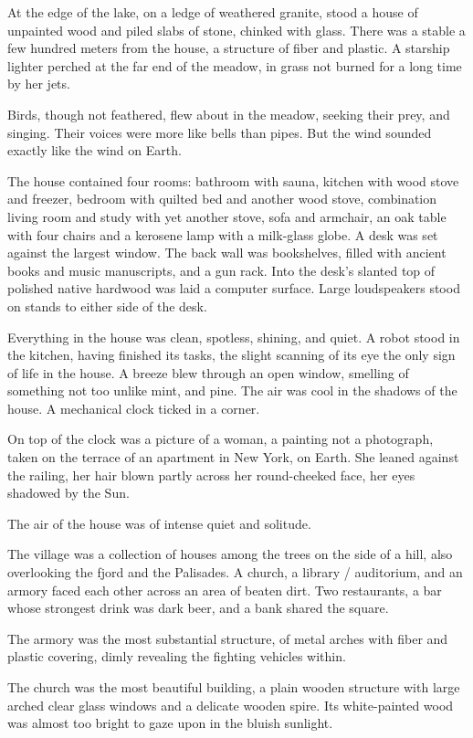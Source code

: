 \documentclass[english,11pt,letterpaper,onecolumn]{scrbook}
\begin{document}
	At the edge of the lake, on a ledge of weathered granite, stood a house of unpainted wood and piled slabs of stone, chinked with glass. There was a stable a few hundred meters from the house, a structure of fiber and plastic. A starship lighter perched at the far end of the meadow, in grass not burned for a long time by her jets.

	Birds, though not feathered, flew about in the meadow, seeking their prey, and singing. Their voices were more like bells than pipes. But the wind sounded exactly like the wind on Earth.

	The house contained four rooms: bathroom with sauna, kitchen with wood stove and freezer, bedroom with quilted bed and another wood stove, combination living room and study with yet another stove, sofa and armchair, an oak table with four chairs and a kerosene lamp with a milk-glass globe. A desk was set against the largest window. The back wall was bookshelves, filled with ancient books and music manuscripts, and a gun rack. Into the desk's slanted top of polished native hardwood was laid a computer surface. Large loudspeakers stood on stands to either side of the desk. 

	Everything in the house was clean, spotless, shining, and quiet. A robot stood in the kitchen, having finished its tasks, the slight scanning of its eye the only sign of life in the house. A breeze blew through an open window, smelling of something not too unlike mint, and pine.  The air was cool in the shadows of the house. A mechanical clock ticked in a corner. 

	On top of the clock was a picture of a woman, a painting not a photograph, taken on the terrace of an apartment in New York, on Earth. She leaned against the railing, her hair blown partly across her round-cheeked face, her eyes shadowed by the Sun.

	The air of the house was of intense quiet and solitude.

	The village was a collection of houses among the trees on the side of a hill, also overlooking the fjord and the Palisades. A church, a library / auditorium, and an armory faced each other across an area of beaten dirt. Two restaurants, a bar whose strongest drink was dark beer, and a bank shared the square. 

	The armory was the most substantial structure, of metal arches with fiber and plastic covering, dimly revealing the fighting vehicles within. 

	The church was the most beautiful building, a plain wooden structure with large arched clear glass windows and a delicate wooden spire. Its white-painted wood was almost too bright to gaze upon in the bluish sunlight. 
\end{document}
